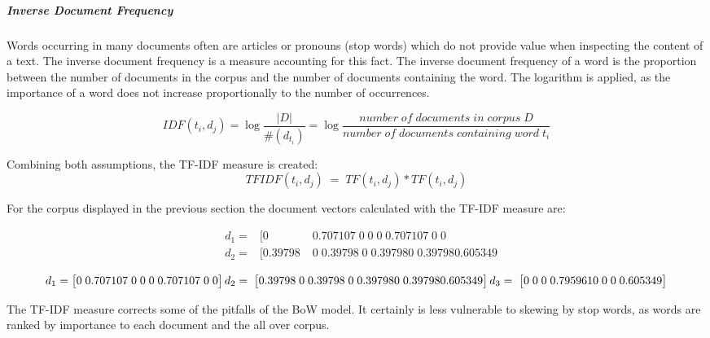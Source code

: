             \subparagraph{Inverse Document Frequency}
            Words occurring in many documents often are articles or pronouns (stop words) which do not provide value when inspecting the content of a text. The inverse document frequency is a measure accounting for this fact. The inverse document frequency of a word is the proportion between the number of documents in the corpus and the number of documents containing the word. The logarithm is applied, as the importance of a word does not increase proportionally to the number of occurrences.
        
            \[ IDF(t_{i}, d_{j}) = \log \dfrac{|D|}{\#(d_{t_{i}}) } =  \log \dfrac{number \;  of\;  documents \;  in \; corpus \; D}{ number \; of \; documents \; containing \; word \; t_{i}} \]
            
            Combining both assumptions, the \ac{TF-IDF} measure is created:
             \[ TFIDF(t_{i}, d_{j}) \;=\; TF(t_{i}, d_{j}) * TF(t_{i}, d_{j})\]
            
            For the corpus displayed in the previous section the document vectors calculated with the \ac{TF-IDF} measure are:
            
                    
            \begin{align}
                &d_1 = & [ 0\;	&0.707107\;	0\;	0\;	0\;	0.707107\;	0\;	0 \\
                &d_2 = & [ 0.39798\;	&0\;	0.39798\;	0\;	0.39798	0\;	0.39798	0.605349 
            \end{align}
                
                \[d_1 = \begin{bmatrix} 0\;	0.707107\;	0\;	0\;	0\;	0.707107\;	0\;	0 \end{bmatrix}	 \\
                d_2 =  \;\begin{bmatrix} 0.39798\;	0\;	0.39798\;	0\;	0.39798	0\;	0.39798	0.605349 \end{bmatrix} \\
                d_3 = \;\begin{bmatrix} 0\;	0\;	0\;	0.795961	0\;	0\;	0\;	0.605349 \end{bmatrix} \]
                
            The \ac{TF-IDF} measure corrects some of the pitfalls of the \ac{BoW} model. It certainly is less vulnerable to skewing by stop words,  as words are ranked by importance to each document and the all over corpus. 
            
